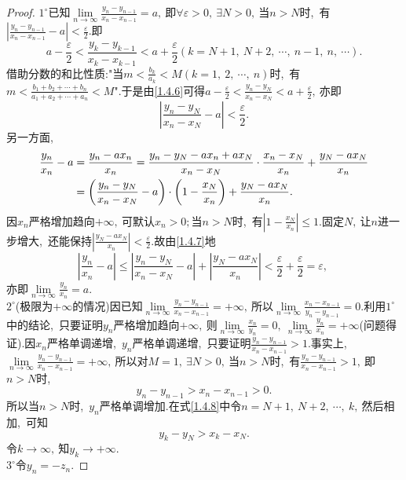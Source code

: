 \begin{proof}
	$1^{\circ}$已知$\lim\limits_{n\rightarrow\infty}\frac{y_n-y_{n-1}}{x_n-x_{n-1}}=a,\ $即$\forall\varepsilon>0,\ \exists N>0,\ $当$n>N$时,\ 有$\left|\frac{y_n-y_{n-1}}{x_n-x_{n-1}}-a\right|<\frac{\varepsilon}{2}.$即
	\begin{equation}
		a-\frac{\varepsilon}{2}<\frac{y_k-y_{k-1}}{x_k-x_{k-1}}<a+\frac{\varepsilon}{2}(k=N+1,\ N+2,\ \cdots,\ n-1,\ n,\ \cdots).\label{1.4.6}
	\end{equation}
	借助分数的和比性质:"当$m<\frac{b_k}{a_k}<M(k=1,\ 2,\ \cdots,\ n)$时,\ 有$m<\frac{b_1+b_2+\cdots+b_n}{a_1+a_2+\cdots+a_n}<M$".于是由\eqref{1.4.6}可得$a-\frac{\varepsilon}{2}<\frac{y_n-y_N}{x_n-x_N}<a+\frac{\varepsilon}{2},\ $亦即
	$$\left|\frac{y_n-y_N}{x_n-x_N}-a\right|<\frac{\varepsilon}{2}.$$
	另一方面,\ 
	\begin{align}
		\frac{y_n}{x_n}-a&=\frac{y_n-ax_n}{x_n}=\frac{y_n-y_N-ax_n+ax_N}{x_n-x_N}\cdot\frac{x_n-x_N}{x_n}+\frac{y_N-ax_N}{x_n}\notag\\
		&=\left(\frac{y_n-y_N}{x_n-x_N}-a\right)\cdot\left(1-\frac{x_N}{x_n}\right)+\frac{y_N-ax_N}{x_n}.\label{1.4.7}
	\end{align}
	因$x_n$严格增加趋向$+\infty,\ $可默认$x_n>0;$当$n>N$时,\ 有$\left|1-\frac{x_N}{x_n}\right|\leqslant 1.$固定$N,\ $让$n$进一步增大,\ 还能保持$\left|\frac{y_N-ax_N}{x_n}\right|<\frac{\varepsilon}{2}.$故由\eqref{1.4.7}地
	$$\left|\frac{y_n}{x_n}-a\right|\leqslant\left|\frac{y_n-y_N}{x_n-x_N}-a\right|+\left|\frac{y_N-ax_N}{x_n}\right|<\frac{\varepsilon}{2}+\frac{\varepsilon}{2}=\varepsilon,\ $$
	亦即$\lim\limits_{n\rightarrow\infty}\frac{y_n}{x_n}=a.$\\
	$2^{\circ}$(极限为$+\infty$的情况)因已知$\lim\limits_{n\rightarrow\infty}\frac{y_n-y_{n-1}}{x_n-x_{n-1}}=+\infty,\ $所以$\lim\limits_{n\rightarrow\infty}\frac{x_n-x_{n-1}}{y_n-y_{n-1}}=0.$利用$1^{\circ}$中的结论,\ 只要证明$y_n$严格增加趋向$+\infty,\ $则$\lim\limits_{n\rightarrow\infty}\frac{x_n}{y_n}=0,\ \lim\limits_{n\rightarrow\infty}\frac{y_n}{x_n}=+\infty$(问题得证).因$x_n$严格单调递增,\ $y_n$严格单调递增,\ 只要证明$\frac{y_n-y_{n-1}}{x_{n}-x_{n-1}}>1.$事实上,\ $\lim\limits_{n\rightarrow\infty}\frac{y_n-y_{n-1}}{x_n-x_{n-1}}=+\infty,\ $所以对$M=1,\ \exists N>0,\ $当$n>N$时,\ 有$\frac{y_n-y_{n-1}}{x_{n}-x_{n-1}}>1,\ $即$n>N$时,\ 
	\begin{equation}
		y_n-y_{n-1}>x_n-x_{n-1}>0.\label{1.4.8}
	\end{equation}
	所以当$n>N$时,\ $y_n$严格单调增加.在式\eqref{1.4.8}中令$n=N+1,\ N+2,\ \cdots,\ k,\ $然后相加,\ 可知
	$$y_k-y_N>x_k-x_N.$$
	令$k\rightarrow\infty,\ $知$y_k\rightarrow+\infty.$\\
	$3^{\circ}$令$y_n=-z_n.$
\end{proof}
